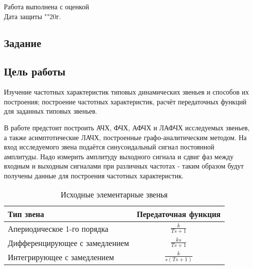 \documentclass[a4paper, 11pt]{article}
\begin{document}
\begin{titlepage}
		Работа выполнена с оценкой \hspace{1cm} \underline{\hspace{8cm}} \\ 
		\vspace{1cm}
		Дата защиты "\underline{\hspace{0.7cm}}"\hspace{0.2cm}\underline{\hspace{2cm}}\hspace{0.2cm}20\underline{\hspace{0.7cm}}г.

\end{titlepage}

\begin{center}
\section*{Задание}
\end{center}

\subsection*{Цель работы} 
\par
Изучение частотных характеристик типовых динамических звеньев и способов их построения; построение частотных характеристик, расчёт передаточных функций для заданных типовых звеньев.
\par
В работе предстоит построить АЧХ, ФЧХ, АФЧХ и ЛАФЧХ исследуемых звеньев, а также асимптотические ЛАЧХ, построенные графо-аналитическим методом. На вход исследуемого звена подаётся синусоидальный сигнал постоянной амплитуды. Надо измерить амплитуду выходного сигнала и сдвиг фаз между входным и выходным сигналами при различных частотах - таким образом будут получены данные для построения частотных характеристик. 

\begin{table}[h!]
    \centering
    \begin{threeparttable}
    	\caption{Исходные элементарные звенья}
    	\begin{tabular} {|l|c|}
        \hline
        	Тип звена & Передаточная функция \\ [0.5cm]  \hline
        	Апериодическое 1-го порядка & $\displaystyle\frac{k}{Ts + 1}$ \\ [0.5cm]  \hline
        	Дифференцирующее с замедлением & $\displaystyle\frac{ks}{Ts+1}$ \\ [0.5cm]  \hline
        	Интегрирующее с замедлением & $\displaystyle\frac{k}{s(Ts + 1)}$ \\ [0.5cm] \hline
    	\end{tabular}
    \end{threeparttable} 
\end{table}
\end{document}
